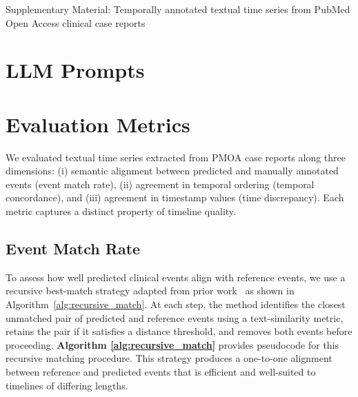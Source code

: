 \begin{center}
    {\LARGE Supplementary Material: Temporally annotated textual time series from PubMed Open Access clinical case reports}
\end{center}
\vspace{1em} 


\section{LLM Prompts}
\label{apd:llm-prompts}







\section{Evaluation Metrics}
\label{apd:evaluation-metrics}

We evaluated textual time series extracted from PMOA case reports along three dimensions:
(i) semantic alignment between predicted and manually annotated events (event match rate),
(ii) agreement in temporal ordering (temporal concordance), and
(iii) agreement in timestamp values (time discrepancy).  
Each metric captures a distinct property of timeline quality.

\subsection{Event Match Rate}
\label{apd:event-match-rate}

To assess how well predicted clinical events align with reference events, we use a recursive
best-match strategy adapted from prior work~\cite{wang2025large} as shown in Algorithm~\ref{alg:recursive_match}. At each step, the method
identifies the closest unmatched pair of predicted and reference events using a text-similarity
metric, retains the pair if it satisfies a distance threshold, and removes both events before
proceeding. \textbf{Algorithm \ref{alg:recursive_match}} provides pseudocode for this recursive matching procedure.
This strategy produces a one-to-one alignment between reference and predicted events that is
efficient and well-suited to timelines of differing lengths. 

